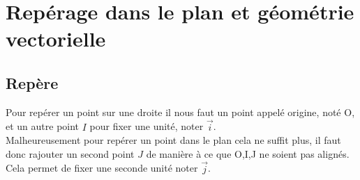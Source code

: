 \documentclass[french]{book}
\begin{document}
\chapter*{Repérage dans le plan et géométrie vectorielle}
\section{Repère}

Pour repérer un point sur une droite il nous faut un point appelé origine, noté O, et un autre point $I$ pour fixer une unité, noter $\overrightarrow{i}$.\\
 
Malheureusement pour repérer un point dans le plan cela ne suffit plus, il faut donc rajouter un second point $J$ de manière à ce que O,I,J ne soient pas alignés. Cela permet de fixer une seconde unité noter $\overrightarrow{j}$. 
\end{document}
